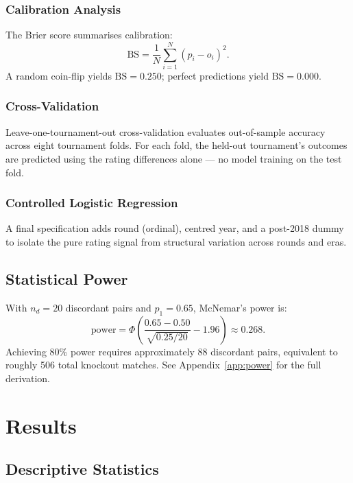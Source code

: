 \documentclass[12pt, a4paper]{article}
\begin{document}
\subsubsection{Calibration Analysis}

The Brier score \cite{brier1950} summarises calibration:
\[
  \text{BS} = \frac{1}{N} \sum_{i=1}^{N}(p_i - o_i)^{2}.
\]
A random coin-flip yields $\text{BS} = 0.250$; perfect predictions yield $\text{BS} = 0.000$.

\subsubsection{Cross-Validation}

Leave-one-tournament-out cross-validation evaluates out-of-sample accuracy across eight
tournament folds. For each fold, the held-out tournament's outcomes are predicted using the
rating differences alone --- no model training on the test fold.

\subsubsection{Controlled Logistic Regression}

A final specification adds round (ordinal), centred year, and a post-2018 dummy to isolate the
pure rating signal from structural variation across rounds and eras.

\subsection{Statistical Power}

With $n_d = 20$ discordant pairs and $p_1 = 0.65$, McNemar's power is:
\[
  \text{power} = \Phi\!\left(\frac{0.65 - 0.50}{\sqrt{0.25/20}} - 1.96\right) \approx 0.268.
\]
Achieving 80\% power requires approximately 88 discordant pairs, equivalent to roughly 506
total knockout matches. See Appendix~\ref{app:power} for the full derivation.

\section{Results}

\subsection{Descriptive Statistics}
\end{document}
